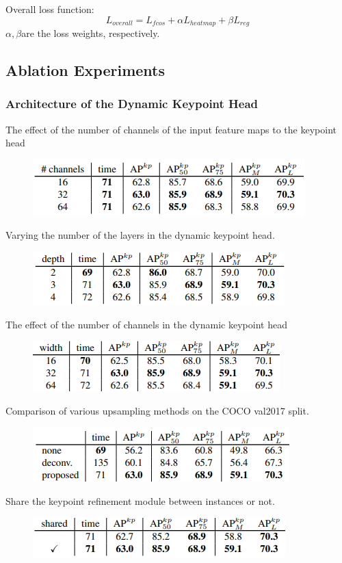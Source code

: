 \documentclass[11pt]{article}
\begin{document}
Overall loss function:
$$L_{overall} = L_{fcos} + \alpha L_{heatmap} + \beta L_{reg}$$
$\alpha,\beta$are the loss weights, respectively.
\subsection{Ablation Experiments}
\subsubsection{Architecture of the Dynamic Keypoint Head}
The effect of the number of channels of the input feature maps to the keypoint head
\begin{figure}[H]
	\centering
	\includegraphics[scale = 0.5]{11}
\end{figure}
Varying the number of the layers in the dynamic keypoint head.
\begin{figure}[H]
	\centering
	\includegraphics[scale = 0.5]{12}
\end{figure}
The effect of the number of channels in the dynamic keypoint head
\begin{figure}[H]
	\centering
	\includegraphics[scale = 0.5]{13}
\end{figure}
Comparison of various upsampling methods on the COCO val2017 split.
\begin{figure}[H]
	\centering
	\includegraphics[scale = 0.5]{14}
\end{figure}
Share the keypoint refinement module between instances or not.
\begin{figure}[H]
	\centering
	\includegraphics[scale = 0.5]{15}
\end{figure}
\end{document}
